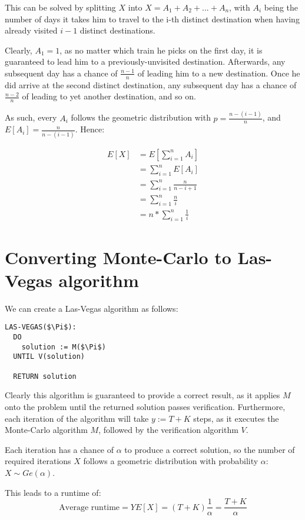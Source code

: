 \documentclass[a4paper]{scrreprt}
\begin{document}
This can be solved by splitting $X$ into $X = A_1 + A_2 + ... + A_n$, with
$A_i$ being the number of days it takes him to travel to the i-th distinct
destination when having already visited $i-1$ distinct destinations.

Clearly, $A_1 = 1$, as no matter which train he picks on the first day, it is
guaranteed to lead him to a previously-unvisited destination. Afterwards, any
subsequent day has a chance of $\frac{n-1}{n}$ of leading him to a new
destination. Once he did arrive at the second distinct destination, any
subsequent day has a chance of $\frac{n-2}{n}$ of leading to yet another
destination, and so on.

As such, every $A_i$ follows the geometric distribution with $p =
\frac{n-(i-1)}{n}$, and $E[A_i] = \frac{n}{n-(i-1)}$. Hence:

\begin{align*}
	E[X] & = E\left[\sum_{i=1}^{n}{A_i}\right] \\
	     & = \sum_{i=1}^{n}{E[A_i]} \\
	     & = \sum_{i=1}^{n}{\frac{n}{n-i+1}} \\
	     & = \sum_{i=1}^{n}{\frac{n}{i}} \\
	     & = n * \sum_{i=1}^{n}{\frac{1}{i}}
\end{align*}

\section{Converting Monte-Carlo to Las-Vegas algorithm}

We can create a Las-Vegas algorithm as follows:

\begin{lstlisting}[mathescape=true]
LAS-VEGAS($\Pi$):
  DO
    solution := M($\Pi$)
  UNTIL V(solution)

  RETURN solution
\end{lstlisting}

Clearly this algorithm is guaranteed to provide a correct result, as it applies
$M$ onto the problem until the returned solution passes verification.
Furthermore, each iteration of the algorithm will take $y := T + K$ steps, as it
executes the Monte-Carlo algorithm $M$, followed by the verification algorithm
$V$.

Each iteration has a chance of $\alpha$ to produce a correct solution, so the
number of required iterations $X$ follows a geometric distribution with
probability $\alpha$: $X \sim Ge(\alpha)$.

This leads to a runtime of:
\[
  \text{Average runtime} = Y E[X] = (T + K) \frac{1}{\alpha} = \frac{T + K}{\alpha}
\]
\end{document}
